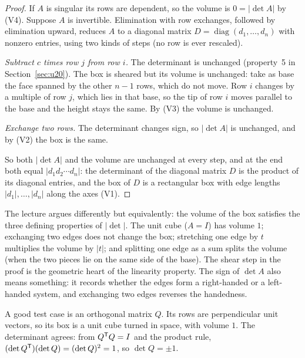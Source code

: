 \begin{proof}
If $A$ is singular its rows are dependent, so the volume is $0=|\det A|$ by (V4).
Suppose $A$ is invertible. Elimination with row exchanges, followed by elimination upward,
reduces $A$ to a diagonal matrix $D=\operatorname{diag}(d_1,\dots,d_n)$ with nonzero
entries, using two kinds of steps (no row is ever rescaled).

\emph{Subtract $c$ times row $j$ from row $i$.} The determinant is unchanged (property~5 in
Section~\ref{sec:u20}). The box is sheared but its volume is unchanged: take as base the
face spanned by the other $n-1$ rows, which do not move. Row $i$ changes by a multiple of
row $j$, which lies in that base, so the tip of row $i$ moves parallel to the base and the
height stays the same. By (V3) the volume is unchanged.

\emph{Exchange two rows.} The determinant changes sign, so $|\det A|$ is unchanged, and by
(V2) the box is the same.

So both $|\det A|$ and the volume are unchanged at every step, and at the end both equal
$|d_1d_2\cdots d_n|$: the determinant of the diagonal matrix $D$ is the product of its
diagonal entries, and the box of $D$ is a rectangular box with edge lengths
$|d_1|,\dots,|d_n|$ along the axes (V1).
\end{proof}

The lecture argues differently but equivalently: the volume of the box satisfies the three
defining properties of $|\det|$. The unit cube ($A=I$) has volume $1$; exchanging two edges
does not change the box; stretching one edge by $t$ multiplies the volume by $|t|$; and
splitting one edge as a sum splits the volume (when the two pieces lie on the same side of the
base). The shear step in the proof is the geometric heart of the linearity property. The sign
of $\det A$ also means something: it records whether the edges form a right-handed or a
left-handed system, and exchanging two edges reverses the handedness.

A good test case is an orthogonal matrix $Q$. Its rows are perpendicular unit vectors, so its
box is a unit cube turned in space, with volume $1$. The determinant agrees: from
$Q^{\mathsf{T}} Q=I$ and the product rule, $(\det Q^{\mathsf{T}})(\det Q)=(\det Q)^{2}=1$, so $\det Q=\pm 1$.


